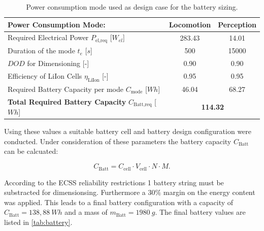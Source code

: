 \begin{table}[htb]
\centering

\begin{tabular}{|l|c|c|}
\hline
\textbf{Power Consumption Mode:}                        & \textbf{Locomotion} & \textbf{Perception} \\ \hline
Required Electrical Power $P_\text{el,req}$ [$W_{el}$]         & 283.43              & 14.01               \\ \hline
Duration of the mode $t_e$ [$s$]                          & 500              & 15000            \\ \hline
$DOD$ for Dimensioning [-]                              & 0.90                & 0.90                \\ \hline
Efficiency of LiIon Cells $\eta_\text{LiIon}$ [-]       & 0.95                & 0.95                \\ \hline
Required Battery Capacity per mode $C_\text{mode}$ [$Wh$] & 46.04               & 68.27               \\ \hline
\textbf{Total Required Battery Capacity} $C_\text{Batt,req}$ [$Wh$]    & \multicolumn{2}{c|}{\textbf{114.32}}               \\ \hline
\end{tabular}

\caption{Power consumption mode used as design case for the battery sizing.}
\label{tab:batsize}
\end{table}

Using these values a suitable battery cell and battery design configuration were conducted. Under consideration of these parameters the battery capacity $C_\text{Batt}$ can be calcuated:

\begin{equation}
C_\text{Batt} = C_\text{cell} \cdot V_\text{cell} \cdot N \cdot M .
\label{eq:batuse}
\end{equation}

According to the ECSS reliability restrictions 1 battery string must be substracted for dimensionsing. Furthermore a $30 \%$ margin on the energy content was applied. This leads to a final battery configuration with a capacity of $C_\text{Batt}=138,88 \ Wh$ and a mass of $m_\text{Batt} = 1980 \ g$. The final battery values are listed in \autoref{tab:battery}.


